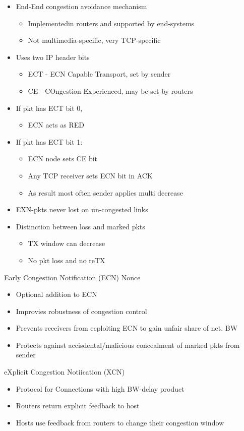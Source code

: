 \documentclass[a4paper]{article}
\begin{document}
\begin{itemize}
	\item End-End congestion avoidance mechanism
	\begin{itemize}
		\item Implementedin routers and supported by end-systems
		\item Not multimedia-specific, very TCP-specific
	\end{itemize}
	\item Uses two IP header bits
	\begin{itemize}
		\item ECT - ECN Capable Transport, set by sender
		\item CE - COngestion Experienced, may be set by routers
	\end{itemize}
	\item If pkt has ECT bit 0,
	\begin{itemize}
		\item ECN acts as RED
	\end{itemize}
	\item If pkt has ECT bit 1:
	\begin{itemize}
		\item ECN node sets CE bit
		\item Any TCP receiver sets ECN bit in ACK
		\item As result most often sender applies multi decrease
	\end{itemize}
	\item EXN-pkts never lost on un-congested links
	\item Distinction between loss and marked pkts
	\begin{itemize}
		\item TX window can decrease
		\item No pkt loss and no reTX
	\end{itemize}
\end{itemize}
Early Congestion Notification (ECN) Nonce
\begin{itemize}
	\item Optional addition to ECN
	\item Improvies robustness of congestion control
	\item Prevents receivers from ecploiting ECN to gain unfair share of
		net. BW
	\item Protects against accisdental/malicious concealment of marked pkts
		from sender
\end{itemize}
eXplicit Congestion Notiication (XCN)
\begin{itemize}
	\item Protocol for Connections with high BW-delay product
	\item Routers return explicit feedback to host
	\item Hosts use feedback from routers to change their congestion window
\end{itemize}
\end{document}
